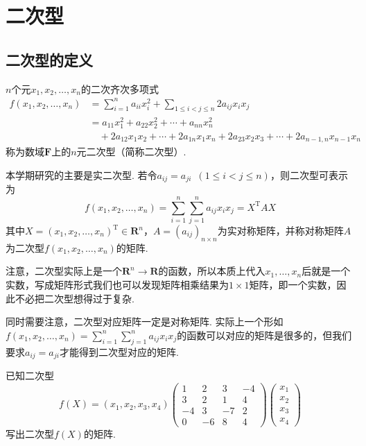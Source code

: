 \chapter{二次型}

\section{二次型的定义}

\begin{definition}
    $n$个元$x_1,x_2,\ldots,x_n$的二次齐次多项式
    \begin{align*}
        f(x_1,x_2,\ldots,x_n) & = \sum_{i=1}^{n}a_{ii}x_i^2+\sum\limits_{1\leqslant i<j\leqslant n}2a_{ij}x_ix_j    \\
                              & = a_{11}x_1^2+a_{22}x_2^2+\cdots+a_{nn}x_n^2                                        \\
                              & \quad +2a_{12}x_1x_2+\cdots+2a_{1n}x_1x_n+2a_{23}x_2x_3+\cdots+2a_{n-1,n}x_{n-1}x_n
    \end{align*}
    称为数域$\mathbf{F}$上的$n$元二次型（简称二次型）.
\end{definition}
本学期研究的主要是实二次型. 若令$a_{ij}=a_{ji}\enspace(1\leqslant i<j\leqslant n)$，则二次型可表示为
\[f(x_1,x_2,\ldots,x_n)=\sum_{i=1}^{n}\sum_{j=1}^{n}a_{ij}x_ix_j=X^\mathrm{T}AX\]
其中$X=(x_1,x_2,\ldots,x_n)^\mathrm{T}\in\mathbf{R}^n$，$A=(a_{ij})_{n\times n}$为实对称矩阵，并称对称矩阵$A$为二次型$f(x_1,x_2,\ldots,x_n)$的矩阵.

注意，二次型实际上是一个$\mathbf{R}^n\to\mathbf{R}$的函数，所以本质上代入$x_1,\ldots,x_n$后就是一个实数，写成矩阵形式我们也可以发现矩阵相乘结果为$1\times 1$矩阵，即一个实数，因此不必把二次型想得过于复杂.

同时需要注意，二次型对应矩阵一定是对称矩阵. 实际上一个形如$f(x_1,x_2,\ldots,x_n)=\displaystyle\sum_{i=1}^{n}\displaystyle\sum_{j=1}^{n}a_{ij}x_ix_j$的函数可以对应的矩阵是很多的，但我们要求$a_{ij}=a_{ji}$才能得到二次型对应的矩阵.
\begin{example}
    已知二次型
    \[f(X)=(x_1,x_2,x_3,x_4)\begin{pmatrix}
            1 & 2 & 3 & -4 \\ 3 & 2 & 1 & 4 \\ -4 & 3 & -7 & 2 \\ 0 & -6 & 8 & 4
        \end{pmatrix}\begin{pmatrix}
            x_1 \\ x_2 \\ x_3 \\ x_4
        \end{pmatrix}\]
    写出二次型$f(X)$的矩阵.
\end{example}

